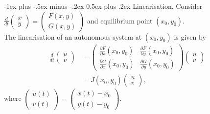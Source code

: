\documentclass[10pt,landscape,a4paper]{article}
\makeatletter
\renewcommand{\section}{\@startsection{section}{1}{0mm}%
	{-1ex plus -.5ex minus -.2ex}%
	{0.5ex plus .2ex}%
	{\normalfont\large\bfseries}}
\makeatother
\begin{document}
\begin{multicols}{3}
	\section{Linearisation.}
	Consider $ \frac{d}{dt} \begin{pmatrix}x\\y\end{pmatrix} = \begin{pmatrix}F(x,y)\\G(x,y)\end{pmatrix} $ and equilibrium point $ \left(x_0,y_0\right) $.\\
	The linearisation of an autonomous system at $ \left(x_0,y_0\right) $ is given by
	\begin{align*}
		\frac{d}{dt} \begin{pmatrix}u\\v\end{pmatrix} & =
		\begin{pmatrix}
			\frac{\partial F}{\partial x} \left(x_0,y_0\right) & \frac{\partial F}{\partial y} \left(x_0,y_0\right) \\
			\frac{\partial G}{\partial x} \left(x_0,y_0\right) & \frac{\partial G}{\partial y} \left(x_0,y_0\right)
		\end{pmatrix}\begin{pmatrix}u\\v\end{pmatrix} \\
		                                              & = J\left(x_0,y_0\right)\begin{pmatrix}u\\v\end{pmatrix},
	\end{align*}
	where $ \begin{pmatrix}u(t)\\v(t)\end{pmatrix} = \begin{pmatrix}x(t)-x_0\\y(t)-y_0\end{pmatrix} $.
	

\end{multicols}
\end{document}
